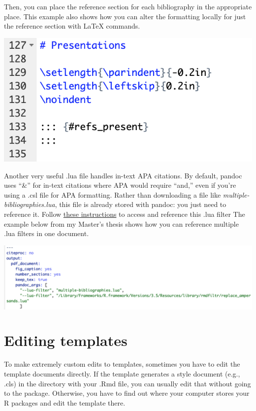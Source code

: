 \documentclass[
]{book}
\begin{document}
Then, you can place the reference section for each bibliography in the appropriate place. This example also shows how you can alter the formatting locally for just the reference section with LaTeX commands.

\includegraphics[width=8.64in]{images/references_placement}

Another very useful .lua file handles in-text APA citations. By default, pandoc uses ``\&'' for in-text citations where APA would require ``and,'' even if you're using a .csl file for APA formatting. Rather than downloading a file like \emph{multiple-bibliographies.lua}, this file is already stored with pandoc: you just need to reference it. Follow \href{https://cran.rstudio.com/web/packages/rmdfiltr/vignettes/replace_ampersands.html}{these instructions} to access and reference this .lua filter The example below from my Master's thesis shows how you can reference multiple .lua filters in one document.

\includegraphics[width=21.94in]{images/lua_example}

\hypertarget{editing-templates}{%
\section{Editing templates}\label{editing-templates}}

To make extremely custom edits to templates, sometimes you have to edit the template documents directly. If the template generates a style document (e.g., .cls) in the directory with your .Rmd file, you can usually edit that without going to the package. Otherwise, you have to find out where your computer stores your R packages and edit the template there.
\end{document}
